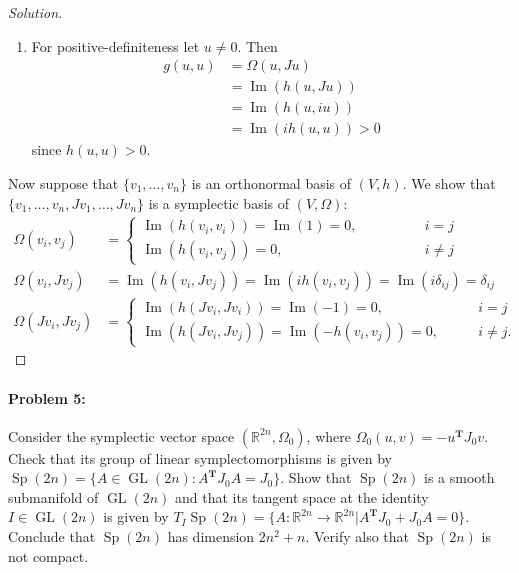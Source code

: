 \begin{proof}[Solution]
\begin{enumerate}
		\item For positive-definiteness let $u\neq 0$. Then
			\begin{align*}
				g(u,u)&=\Omega(u,Ju)\\
				&=\operatorname{Im}(h(u,Ju))\\
				&=\operatorname{Im}(h(u,iu))\\
				&=\operatorname{Im}(ih(u,u))>0
			\end{align*}
			since $h(u,u)>0$.
	\end{enumerate}
	Now suppose that $\{v_1,\ldots,v_n\}$ is an orthonormal basis of  $(V,h)$. We show that $\{v_1,\ldots,v_n,Jv_1,\ldots,Jv_n\}$ is a symplectic basis of $(V,\Omega)$:
	\begin{align*}
		\Omega(v_i,v_j)&=\begin{cases}
			\operatorname{Im}(h(v_i,v_i))=\operatorname{Im}(1)=0,\qquad \qquad & i=j\\
			\operatorname{Im}(h(v_i,v_j))=0,\qquad &i\neq j
		\end{cases}\\
		\Omega(v_i,Jv_j)& =\operatorname{Im}(h(v_i,Jv_j))=\operatorname{Im}(ih(v_i,v_j))=\operatorname{Im}(i\delta_{ij})=\delta_{ij}\\
		\Omega(Jv_i,Jv_j)&=\begin{cases}
			\operatorname{Im}(h(Jv_i,Jv_i))=\operatorname{Im}(-1)=0,\qquad \qquad & i=j\\
			\operatorname{Im}(h(Jv_i,Jv_j))=\operatorname{Im}(-h(v_i,v_j))=0,\qquad &i\neq j.
		\end{cases}
	\end{align*}
\end{proof}

 \paragraph{Problem 5:} Consider the symplectic vector space $(\mathbb{R}^{2n},\Omega_0)$, where $\Omega_0(u,v)=-u^{\mathbf{T}} J_0v$. Check that its group of linear symplectomorphisms is given by $\operatorname{Sp}(2n)=\{A\in \operatorname{GL}(2n):A^{\mathbf{T}}J_0A=J_0\}.$ Show that $\operatorname{Sp}(2n)$ is a smooth submanifold of $\operatorname{GL}(2n)$ and that its tangent space at the identity $I\in \operatorname{GL}(2n)$ is given by $T_{I}\operatorname{Sp}(2n)=\{A:\mathbb{R}^{2n}\to \mathbb{R}^{2n}|A^{\mathbf{T}} J_0+J_0A=0\} $. Conclude that $\operatorname{Sp}(2n)$ has dimension $2n^{2} +n$. Verify also that $\operatorname{Sp}(2n)$ is not compact.

